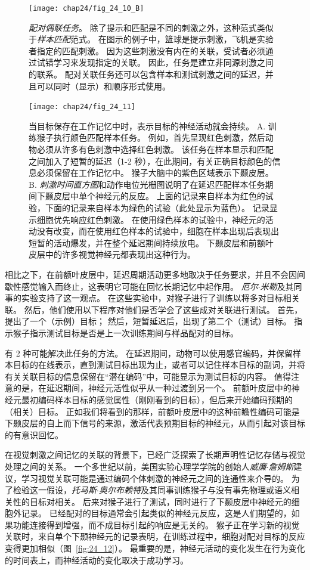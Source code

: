 \begin{figure}[htbp]
	\centering
	\texttt{[image: chap24/fig\_24\_10\_B]}
	\caption{\textit{配对偶联任务}。
		除了提示和匹配是不同的刺激之外，这种范式类似于\textit{样本匹配}范式。
		在图示的例子中，篮球是提示刺激，飞机是实验者指定的匹配刺激。
		因为这些刺激没有内在的关联，受试者必须通过试错学习来发现指定的关联。
		因此，任务是建立非同源刺激之间的联系。
		配对关联任务还可以包含样本和测试刺激之间的延迟，并且可以同时（显示）和顺序形式使用。}
	\label{fig:24_10_b}
\end{figure}


\begin{figure}[htbp]
	\centering
	\texttt{[image: chap24/fig\_24\_11]}
	\caption{当目标保存在工作记忆中时，表示目标的神经活动就会持续。 
		A. 训练猴子执行颜色匹配样本任务。
		例如，首先呈现红色刺激，然后动物必须从许多有色刺激中选择红色刺激。
		该任务在样本显示和匹配之间加入了短暂的延迟（1-2 秒），在此期间，有关正确目标颜色的信息必须保留在工作记忆中。
		猴子大脑中的紫色区域表示下颞皮层。
		B. \textit{刺激时间直方图}和动作电位光栅图说明了在延迟匹配样本任务期间下颞皮层中单个神经元的反应。
		上面的记录来自样本为红色的试验，下面的记录来自样本为绿色的试验（此处显示为蓝色）。
		记录显示细胞优先响应红色刺激。
		在使用绿色样本的试验中，神经元的活动没有改变，而在使用红色样本的试验中，细胞在样本出现后表现出短暂的活动爆发，并在整个延迟期间持续放电。
		下颞皮层和前额叶皮层中的许多视觉神经元都表现出这种行为。}
	\label{fig:24_11}
\end{figure}


相比之下，在前额叶皮层中，延迟周期活动更多地取决于任务要求，并且不会因间歇性感觉输入而终止，这表明它可能在回忆长期记忆中起作用。
\textit{厄尔$\cdot$米勒}及其同事的实验支持了这一观点。
在这些实验中，对猴子进行了训练以将多对目标相关联。
然后，他们使用以下程序对他们是否学会了这些成对关联进行测试。
首先，提出了一个（示例）目标； 然后，短暂延迟后，出现了第二个（测试）目标。
指示猴子指示测试目标是否是上一次训练期间与样品配对的目标。


有 2 种可能解决此任务的方法。
在延迟期间，动物可以使用感官编码，并保留样本目标的在线表示，直到测试目标出现为止，或者可以记住样本目标的副词，并将有关关联目标的信息保留在“潜在编码”中，可能显示为测试目标的内容。
值得注意的是，在延迟期间，神经元活性似乎从一种过渡到另一个。
前额叶皮层中的神经元最初编码样本目标的感觉属性（刚刚看到的目标），但后来开始编码预期的（相关）目标。
正如我们将看到的那样，前额叶皮层中的这种前瞻性编码可能是下颞皮层的自上而下信号的来源，激活代表预期目标的神经元，从而引起对该目标的有意识回忆。


在视觉刺激之间记忆的关联的背景下，已经广泛探索了长期声明性记忆存储与视觉处理之间的关系。
一个多世纪以前，美国实验心理学学院的创始人\textit{威廉$\cdot$詹姆斯}建议，学习视觉关联可能是通过编码个体刺激的神经元之间的连通性来介导的。
为了检验这一假设，\textit{托马斯$\cdot$奥尔布赖特}及其同事训练猴子与没有事先物理或语义相关性的目标对相关。
后来对猴子进行了测试，同时进行了下颞皮层中神经元的细胞外记录。
已经配对的目标通常会引起类似的神经元反应，这是人们期望的，如果功能连接得到增强，而不成目标引起的响应是无关的。
猴子正在学习新的视觉关联时，来自单个下颞神经元的记录表明，在训练过程中，细胞对配对目标的反应变得更加相似（图~\ref{fig:24_12}）。
最重要的是，神经元活动的变化发生在行为变化的时间表上，而神经活动的变化取决于成功学习。


